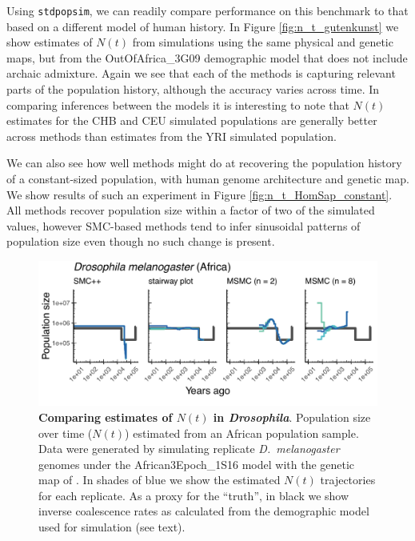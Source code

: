 \documentclass[12pt,halfline,a4paper]{ouparticle}
\newcommand{\stdpopsim}{\texttt{stdpopsim}\xspace}
\begin{document}
Using \stdpopsim, we can readily compare performance on this benchmark to
that based on a different model of human history. In Figure \ref{fig:n_t_gutenkunst} we show estimates of
$N(t)$ from simulations using the same physical and genetic maps, but from the OutOfAfrica\_3G09
demographic model that does not include archaic admixture. Again we see that each
of the methods is capturing relevant parts of the population history, although the
accuracy varies across time. In comparing inferences between the
models it is interesting to note that $N(t)$ estimates for the CHB and CEU
simulated populations are generally better across methods than estimates from the YRI
simulated population.

We can also
see how well methods might do at recovering the population history of a constant-sized population,
with human genome architecture and genetic map.
We show results of such an
experiment in Figure \ref{fig:n_t_HomSap_constant}.
All methods recover population size within a factor of two of the simulated values, however
SMC-based methods
tend to infer sinusoidal
patterns of population size even though no such change is present.


\begin{figure}
\begin{center}
\includegraphics[width=0.8\linewidth]{display_items/DroMel_African3Epoch_1S16.pdf}
\caption{\textbf{Comparing estimates of $N(t)$ in \textit{Drosophila}}. Population
size over time ($N(t)$) estimated from an African population sample. Data were generated by simulating
replicate \textit{D.~melanogaster} genomes under the African3Epoch\_1S16 model \citep{sheehan2016deep}
with the genetic map of \cite{comeron2012many}. In shades of blue we show the estimated
$N(t)$ trajectories for each replicate.
As a proxy for the ``truth'', in black we show inverse coalescence rates
as calculated from the demographic model used for simulation (see text).
}
\label{fig:n_t_sheehan}
\end{center}
\end{figure}
\end{document}
